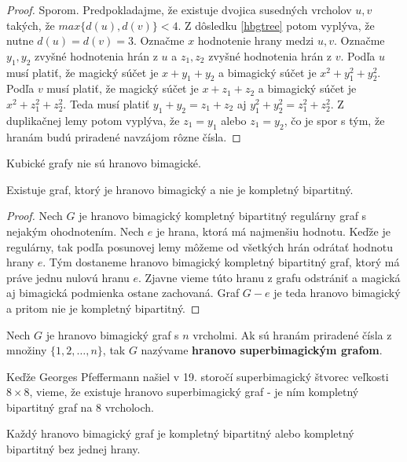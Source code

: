 \begin{proof} Sporom. Predpokladajme, že existuje dvojica susedných vrcholov $u,v$ takých, že $max \{d(u), d(v)\} < 4$. Z dôsledku \ref{hbgtree}  potom vyplýva, že nutne $d(u) = d(v) = 3$. Označme $x$ hodnotenie hrany medzi $u,v$. Označme $y_1, y_2$ zvyšné hodnotenia hrán z $u$ a $z_1, z_2$ zvyšné hodnotenia hrán z $v$. Podľa $u$ musí platiť, že magický súčet je $x + y_1 + y_2$ a bimagický súčet je $x^2 + y^2_1 + y^2_2$. Podľa $v$ musí platiť, že magický súčet je $x + z_1 + z_2$ a bimagický súčet je $x^2 + z^2_1 + z^2_2$. Teda musí platiť $y_1 + y_2 = z_1 + z_2$ aj $y^2_1 + y^2_2 = z^2_1 + z^2_2$. Z duplikačnej lemy potom vyplýva, že $z_1 = y_1$ alebo $z_1 = y_2$, čo je spor s tým, že hranám budú priradené navzájom rôzne čísla.
\end{proof} 

\begin{consequence} Kubické grafy nie sú hranovo bimagické.
\end{consequence}

\begin{theorem} Existuje graf, ktorý je hranovo bimagický a nie je kompletný bipartitný.
\end{theorem}

\begin{proof} Nech $G$ je hranovo bimagický kompletný bipartitný regulárny graf s nejakým ohodnotením. Nech $e$ je hrana, ktorá má najmenšiu hodnotu. Keďže je regulárny, tak podľa posunovej lemy môžeme od všetkých hrán odrátať hodnotu hrany $e$. Tým dostaneme hranovo bimagický kompletný bipartitný graf, ktorý má práve jednu nulovú hranu $e$. Zjavne vieme túto hranu z grafu odstrániť a magická aj bimagická podmienka ostane zachovaná. Graf $G - e$ je teda hranovo bimagický a pritom nie je kompletný bipartitný.
\end{proof}

\begin{definition} Nech $G$ je hranovo bimagický graf s $n$ vrcholmi. Ak sú hranám priradené čísla z množiny $\{1, 2, \dots , n\}$, tak $G$ nazývame \textbf{hranovo superbimagickým grafom}.
\end{definition} 

Keďže Georges Pfeffermann našiel v 19. storočí superbimagický štvorec veľkosti $8 \times 8$, vieme, že existuje hranovo superbimagický graf - je ním kompletný bipartitný graf na $8$ vrcholoch.

\begin{hypothesis} Každý hranovo bimagický graf je kompletný bipartitný alebo kompletný bipartitný bez jednej hrany.
\end{hypothesis} 



